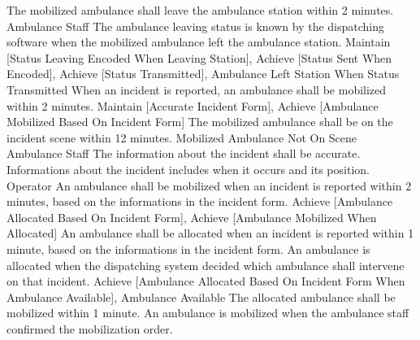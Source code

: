 \stopkaosspec
\startkaosspec
	 {The mobilized ambulance shall leave the ambulance station within 2 minutes.}
	 {Ambulance Staff}
\stopkaosspec
\startkaosspec
	 {The ambulance leaving status is known by the dispatching software when the mobilized ambulance left the ambulance station.}
	 {Maintain [Status Leaving Encoded When Leaving Station], Achieve [Status Sent When Encoded], Achieve [Status Transmitted], Ambulance Left Station When Status Transmitted}
\stopkaosspec
\startkaosspec
	 {When an incident is reported, an ambulance shall be mobilized within 2 minutes.}
	 {Maintain [Accurate Incident Form], Achieve [Ambulance Mobilized Based On Incident Form]}
\stopkaosspec
\startkaosspec
	 {The mobilized ambulance shall be on the incident scene within 12 minutes.}
	 {Mobilized Ambulance Not On Scene}
	 {Ambulance Staff}
\stopkaosspec
\startkaosspec
	 {The information about the incident shall be accurate. Informations about the incident includes when it occurs and its position.}
	 {Operator}
\stopkaosspec
\startkaosspec
	 {An ambulance shall be mobilized when an incident is reported within 2 minutes, based on the informations in the incident form.}
	 {Achieve [Ambulance Allocated Based On Incident Form], Achieve [Ambulance Mobilized When Allocated]}
\stopkaosspec
\startkaosspec
	 {An ambulance shall be allocated when an incident is reported within 1 minute, based on the informations in the incident form. An ambulance is allocated when the dispatching system decided which ambulance shall intervene on that incident.}
	 {Achieve [Ambulance Allocated Based On Incident Form When Ambulance Available], Ambulance Available}
\stopkaosspec
\startkaosspec
	 {The allocated ambulance shall be mobilized within 1 minute. An ambulance is mobilized when the ambulance staff confirmed the mobilization order.}
